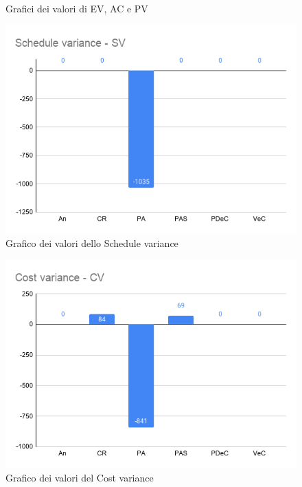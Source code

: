         \begin{figure}
            \centering
            \caption{Grafici dei valori di EV, AC e PV}\label{Y}
            \end{figure}


        \begin{figure}[H]
            \centering
            \includegraphics[width=12 cm]{source/sections/images/schedule_variance.png}
            \caption{Grafico dei valori dello Schedule variance}
        \end{figure}

        \begin{figure}[H]
            \centering
            \includegraphics[width=12 cm]{source/sections/images/cost_variance.png}
            \caption{Grafico dei valori del Cost variance}
        \end{figure}
